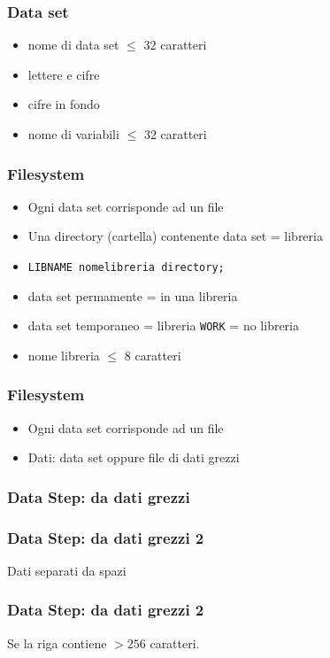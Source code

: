 \begin{frame}\frametitle{Data set}
  \begin{itemize}
  \item
    nome di data set $\le$ 32 caratteri
  \item
    lettere e cifre
  \item
    cifre in fondo
  \item
    nome di variabili $\le$ 32 caratteri
  \end{itemize}
\end{frame}


\begin{frame}\frametitle{Filesystem}
  \begin{itemize}
  \item
    Ogni data set corrisponde ad un file
  \item
    Una directory (cartella) contenente data set = \alert{libreria}
  \item
    \texttt{LIBNAME nomelibreria directory;}
  \item
    data set permamente = in una libreria
  \item
    data set temporaneo = libreria \texttt{WORK} = no libreria
  \item
    nome libreria $\le$ 8 caratteri
  \end{itemize}\end{frame}

\begin{frame}\frametitle{Filesystem}
  \begin{itemize}
  \item
    Ogni data set corrisponde ad un file
  \item
    Dati: data set oppure file di dati grezzi
  \end{itemize}
\end{frame}

\begin{frame}[fragile]\frametitle{Data Step: da dati grezzi}
\end{frame}

\begin{frame}[fragile]\frametitle{Data Step: da dati grezzi 2}
  Dati separati da spazi
\end{frame}

\begin{frame}[fragile]\frametitle{Data Step: da dati grezzi 2}
  Se la riga contiene $>256$ caratteri.
\end{frame}

